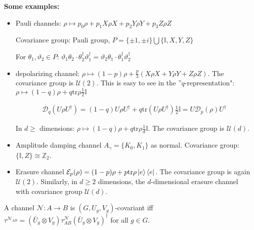 \documentclass[../../note.tex]{subfiles}
\begin{document}
\noindent \textbf{Some examples:}
\begin{itemize}
    \item Pauli channels: $\rho \mapsto p_0 \rho + p_1 X\rho X + p_2 Y\rho Y+p_3 Z \rho Z$
    
    Covariance group: Pauli group, $P=\{\pm 1, \pm i\} \bigcup \{\mathbb{I},X,Y,Z\}$
    
    For $\theta_1,\vartheta_2 \in P$: $\vartheta_1 \theta_2 \cdot \theta_2^{\dagger} \vartheta_1^{\dagger} =\vartheta_2 \theta_1 \cdot \theta_1^{\dagger} \vartheta_2^{\dagger}$ 
    
    \item depolarizing channel: $\rho \mapsto (1-p)\rho + \frac{p}{3} (X\rho X + Y\rho Y + Z \rho Z)$. The covariance group is $\mathcal{U}(2)$. This is easy to see in the ''$q$-representation": $\rho \mapsto (1-q)\rho + q \text{tr}\rho \frac{1}{2} \mathbb{I}$
    
    \begin{align}
        \mathcal{D}_q(U \rho U^{\dagger}) = (1-q) U\rho U^{\dagger} + q \text{tr}(U\rho U^{\dagger}) \frac{1}{2}\mathbb{I} = U \mathcal{D}_p (\rho) U^{\dagger}
    \end{align}
    
    In $d\geq$ dimensions: $\rho \mapsto (1-q) \rho + q \text{tr}\rho \frac{1}{d} \mathbb{I}$. The covariance group is $\mathcal{U}(d)$. 
    
    \item Amplitude damping channel $A_{\gamma} = \{K_0, K_1\}$ as normal. Covariance group: $\{\mathbb{I},Z\} \cong \mathbb{Z}_2$.
    
    \item Erasure channel $\mathcal{E}_p (\rho) = (1-p)\rho + p \text{tr}\rho \ket{e}\bra{e}$. The covariance group is again $\mathcal{U}(2)$. Similarly, in $d\geq 2$ dimensions, the $d$-dimensional erasure channel with covariance group $\mathcal{U}(d)$.
\end{itemize}

\begin{proposition}
A channel $\mathcal{N}: A \rightarrow B$ is $(G,U_g,V_g)$-covariant iff $\tau^{\mathcal{N}_{AB}}=(\bar{U}_g \otimes V_g) \tau^{\mathcal{N}}_{AB} (\bar{U}_g \otimes V_g)^{\dagger}$ for all $g \in G$.
\end{proposition}
\end{document}
